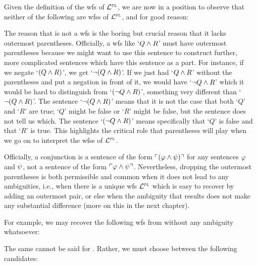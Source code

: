 Given the definition of the wfs of $\mathcal{L}^{\textsc{pl}}$, we are now in a position to observe that neither of the following are wfss of $\mathcal{L}^{\textsc{pl}}$, and for good reason:

\begin{earg} \label{parens}
\end{earg}

The reason that  is not a wfs is the boring but crucial reason that it lacks outermost parentheses.
Officially, a wfs like `$Q \wedge R$' must have outermost parentheses because we might want to use this sentence to construct further, more complicated sentences which have this sentence as a part. 
For instance, if we negate `$(Q \wedge R)$', we get `$\neg(Q \wedge R)$'.
If we just had `$Q \wedge R$' without the parentheses and put a negation in front of it, we would have `$\neg Q \wedge R$' which it would be hard to distinguish from `$(\neg Q \wedge R)$', something very different than `$\neg(Q\wedge R)$'.
The sentence `$\neg(Q \wedge R)$' means that it is not the case that both `$Q$' and `$R$' are true; `$Q$' might be false or `$R$' might be false, but the sentence does not tell us which.
The sentence `$(\neg Q \wedge R)$' means specifically that `$Q$' is false and that `$R$' is true.
This highlights the critical role that parentheses will play when we go on to interpret the wfss of $\mathcal{L}^{\textsc{pl}}$.

Officially, a conjunction is a sentence of the form $\ulcorner(\varphi \wedge \psi)\urcorner$ for any sentences $\varphi$ and $\psi$, not a sentence of the form $\ulcorner\varphi \wedge \psi\urcorner$.
Nevertheless, dropping the outermost parentheses is both permissible and common when it does not lead to any ambiguities, i.e., when there is a unique wfs $\mathcal{L}^{\textsc{pl}}$ which is easy to recover by adding an outermost pair, or else when the ambiguity that results does not make any substantial difference (more on this in the next chapter).

For example, we may recover the following wfs from  without any ambiguity whatsoever:

\begin{earg}
\end{earg}

The same cannot be said for .
Rather, we must choose between the following candidates:

